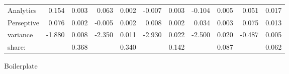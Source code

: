 \documentclass[12pt]{article}
\begin{document}
\begin{landscape}
\begin{table}
\begin{threeparttable}
{\begin{tabular}[l]{l r r r r r r r r r r}
Analytics       &      0.154	&    0.003	  &     0.063	 &    0.002	   &    -0.007	   &    0.003	   &     -0.104  &     0.005	&       0.051   &    0.017   \\
Perseptive      &      0.076	&    0.002	  &    -0.005	 &    0.002	   &     0.008	   &    0.002	   &      0.034  &     0.003	&       0.075   &    0.013   \\
variance        &     -1.880	&    0.008	  &    -2.350	 &    0.011	   &    -2.930	   &    0.022	   &     -2.500  &     0.020	&      -0.487   &    0.005   \\
\cmidrule(l){2-3}  \cmidrule(l){4-5}  \cmidrule(l){6-7}   \cmidrule(l){8-9}  \cmidrule(l){10-11}
share:          &             &     0.368   &            &    0.340    &               &    0.142    &             &     0.087  &               &    0.062   \\
\cmidrule{1-11}                                                                                             
      \end{tabular}
      }
      \begin{tablenotes}
        \item Boilerplate

      \end{tablenotes} \label{tbl:5E_full_regressions_results}


    \end{threeparttable}

\end{table}





\end{landscape}
\end{document}
